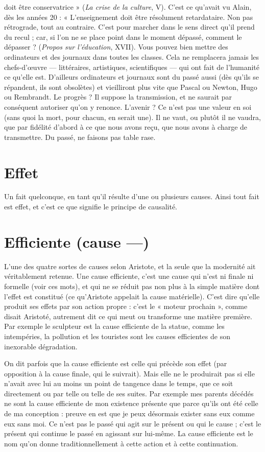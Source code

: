 doit être conservatrice » ({\it La crise de la culture}, V). C’est ce qu'avait vu Alain,
dès les années 20 : « L'enseignement doit être résolument retardataire. Non pas
rétrograde, tout au contraire. C’est pour marcher dans le sens direct qu’il prend
du recul ; car, si l’on ne se place point dans le moment dépassé, comment le
dépasser ? ({\it Propos sur l'éducation}, XVII). Vous pouvez bien mettre des ordinateurs
et des journaux dans toutes les classes. Cela ne remplacera jamais les
chefs-d’œuvre — littéraires, artistiques, scientifiques — qui ont fait de l’humanité
ce qu’elle est. D’ailleurs ordinateurs et journaux sont du passé aussi (dès qu’ils
se répandent, ils sont obsolètes) et vieilliront plus vite que Pascal ou Newton,
Hugo ou Rembrandt. Le progrès ? Il suppose la transmission, et ne saurait par
conséquent autoriser qu’on y renonce. L'avenir ? Ce n’est pas une valeur en soi
(sans quoi la mort, pour chacun, en serait une). Il ne vaut, ou plutôt il ne
vaudra, que par fidélité d’abord à ce que nous avons reçu, que nous avons à
charge de transmettre. Du passé, ne faisons pas table rase.

\section{Effet}
Un fait quelconque, en tant qu’il résulte d’une ou plusieurs causes.
Ainsi tout fait est effet, et c’est ce que signifie le principe de causalité.

\section{Efficiente (cause —)}
L’une des quatre sortes de causes selon Aristote, et
la seule que la modernité ait véritablement
retenue. Une cause efficiente, c’est une cause qui n’est ni finale ni formelle
(voir ces mots), et qui ne se réduit pas non plus à la simple matière dont l'effet
est constitué (ce qu’Aristote appelait la cause matérielle). C’est dire qu’elle produit
ses effets par son action propre : c’est le « moteur prochain », comme disait
Aristoté, autrement dit ce qui meut ou transforme une matière première. Par
exemple le sculpteur est la cause efficiente de la statue, comme les intempéries,
la pollution et les touristes sont les causes efficientes de son inexorable dégradation.

On dit parfois que la cause efficiente est celle qui précède son effet (par
opposition à la cause finale, qui le suivrait). Mais elle ne le produirait pas si elle
n'avait avec lui au moins un point de tangence dans le temps, que ce soit directement
ou par telle ou telle de ses suites. Par exemple mes parents décédés ne
sont la cause efficiente de mon existence présente que parce qu’ils ont été celle
de ma conception : preuve en est que je peux désormais exister sans eux comme
eux sans moi. Ce n’est pas le passé qui agit sur le présent ou qui le cause ; c’est
le présent qui continue le passé en agissant sur lui-même. La cause efficiente est
le nom qu’on donne traditionnellement à cette action et à cette continuation.

